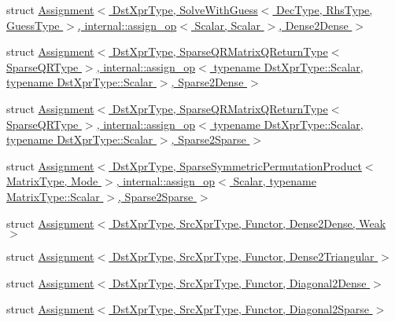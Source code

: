 \begin{DoxyCompactItemize}
\item 
struct \hyperlink{struct_eigen_1_1internal_1_1_assignment_3_01_dst_xpr_type_00_01_solve_with_guess_3_01_dec_type_092a64ffd1d5684a219c114a5d8922118}{Assignment$<$ Dst\+Xpr\+Type, Solve\+With\+Guess$<$ Dec\+Type, Rhs\+Type, Guess\+Type $>$, internal\+::assign\+\_\+op$<$ Scalar, Scalar $>$, Dense2\+Dense $>$}
\item 
struct \hyperlink{struct_eigen_1_1internal_1_1_assignment_3_01_dst_xpr_type_00_01_sparse_q_r_matrix_q_return_type_aa91d8fc26832a494363cd7146c14303}{Assignment$<$ Dst\+Xpr\+Type, Sparse\+Q\+R\+Matrix\+Q\+Return\+Type$<$ Sparse\+Q\+R\+Type $>$, internal\+::assign\+\_\+op$<$ typename Dst\+Xpr\+Type\+::\+Scalar, typename Dst\+Xpr\+Type\+::\+Scalar $>$, Sparse2\+Dense $>$}
\item 
struct \hyperlink{struct_eigen_1_1internal_1_1_assignment_3_01_dst_xpr_type_00_01_sparse_q_r_matrix_q_return_type_359637caee80b00c35b5e63bb0a6509c}{Assignment$<$ Dst\+Xpr\+Type, Sparse\+Q\+R\+Matrix\+Q\+Return\+Type$<$ Sparse\+Q\+R\+Type $>$, internal\+::assign\+\_\+op$<$ typename Dst\+Xpr\+Type\+::\+Scalar, typename Dst\+Xpr\+Type\+::\+Scalar $>$, Sparse2\+Sparse $>$}
\item 
struct \hyperlink{struct_eigen_1_1internal_1_1_assignment_3_01_dst_xpr_type_00_01_sparse_symmetric_permutation_pro69955201e4d84b32d17d1959c46119e9}{Assignment$<$ Dst\+Xpr\+Type, Sparse\+Symmetric\+Permutation\+Product$<$ Matrix\+Type, Mode $>$, internal\+::assign\+\_\+op$<$ Scalar, typename Matrix\+Type\+::\+Scalar $>$, Sparse2\+Sparse $>$}
\item 
struct \hyperlink{struct_eigen_1_1internal_1_1_assignment_3_01_dst_xpr_type_00_01_src_xpr_type_00_01_functor_00_01_dense2_dense_00_01_weak_01_4}{Assignment$<$ Dst\+Xpr\+Type, Src\+Xpr\+Type, Functor, Dense2\+Dense, Weak $>$}
\item 
struct \hyperlink{struct_eigen_1_1internal_1_1_assignment_3_01_dst_xpr_type_00_01_src_xpr_type_00_01_functor_00_01_dense2_triangular_01_4}{Assignment$<$ Dst\+Xpr\+Type, Src\+Xpr\+Type, Functor, Dense2\+Triangular $>$}
\item 
struct \hyperlink{struct_eigen_1_1internal_1_1_assignment_3_01_dst_xpr_type_00_01_src_xpr_type_00_01_functor_00_01_diagonal2_dense_01_4}{Assignment$<$ Dst\+Xpr\+Type, Src\+Xpr\+Type, Functor, Diagonal2\+Dense $>$}
\item 
struct \hyperlink{struct_eigen_1_1internal_1_1_assignment_3_01_dst_xpr_type_00_01_src_xpr_type_00_01_functor_00_01_diagonal2_sparse_01_4}{Assignment$<$ Dst\+Xpr\+Type, Src\+Xpr\+Type, Functor, Diagonal2\+Sparse $>$}

\end{DoxyCompactItemize}
